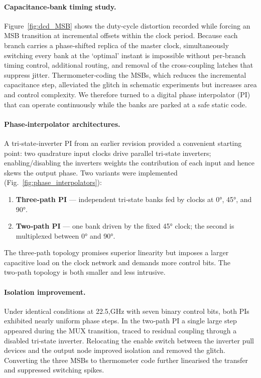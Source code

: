 \paragraph{Capacitance‑bank timing study.} Figure~\ref{fig:dcd_MSB} shows the duty‑cycle distortion recorded while forcing an MSB transition at incremental offsets within the clock period. Because each branch carries a phase‑shifted replica of the master clock, simultaneously switching every bank at the ‘optimal’ instant is impossible without per‑branch timing control, additional routing, and removal of the cross‑coupling latches that suppress jitter. Thermometer‑coding the MSBs, which reduces the incremental capacitance step, alleviated the glitch in schematic experiments but increases area and control complexity. We therefore turned to a digital phase interpolator (PI) that can operate continuously while the banks are parked at a safe static code.

\paragraph{Phase‑interpolator architectures.} A tri‑state‑inverter PI from an earlier revision provided a convenient starting point: two quadrature input clocks drive parallel tri‑state inverters; enabling/disabling the inverters weights the contribution of each input and hence skews the output phase. Two variants were implemented (Fig.~\ref{fig:phase_interpolators}):
\begin{enumerate}
\item \textbf{Three‑path PI} — independent tri‑state banks fed by clocks at \ang{0}, \ang{45}, and \ang{90}.
\item \textbf{Two‑path PI} — one bank driven by the fixed \ang{45} clock; the second is multiplexed between \ang{0} and \ang{90}.
\end{enumerate}
The three‑path topology promises superior linearity but imposes a larger capacitive load on the clock network and demands more control bits. The two‑path topology is both smaller and less intrusive.

\paragraph{Isolation improvement.} Under identical conditions at 22.5,GHz with seven binary control bits, both PIs exhibited nearly uniform phase steps. In the two‑path PI a single large step appeared during the MUX transition, traced to residual coupling through a disabled tri‑state inverter. Relocating the enable switch between the inverter pull devices and the output node improved isolation and removed the glitch. Converting the three MSBs to thermometer code further linearised the transfer and suppressed switching spikes.

